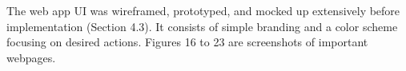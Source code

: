 \documentclass{article}
\begin{document}
The web app UI was wireframed, prototyped, and mocked up extensively before implementation (Section 4.3). It consists of simple branding and a color scheme focusing on desired actions. Figures 16 to 23 are screenshots of important webpages.

\begin{figure}[h]
\end{figure}
\end{document}
